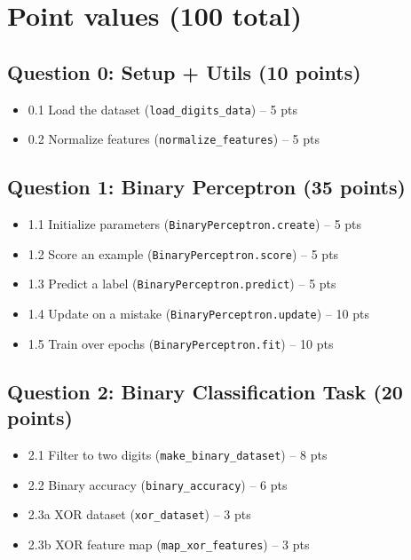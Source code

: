 \documentclass[11pt]{article}
\begin{document}
\section*{Point values (100 total)}

\subsection*{Question 0: Setup + Utils (10 points)}
\begin{itemize}[leftmargin=1.25em]
  \item 0.1 Load the dataset (\texttt{load\_digits\_data}) -- 5 pts
  \item 0.2 Normalize features (\texttt{normalize\_features}) -- 5 pts
\end{itemize}

\subsection*{Question 1: Binary Perceptron (35 points)}
\begin{itemize}[leftmargin=1.25em]
  \item 1.1 Initialize parameters (\texttt{BinaryPerceptron.create}) -- 5 pts
  \item 1.2 Score an example (\texttt{BinaryPerceptron.score}) -- 5 pts
  \item 1.3 Predict a label (\texttt{BinaryPerceptron.predict}) -- 5 pts
  \item 1.4 Update on a mistake (\texttt{BinaryPerceptron.update}) -- 10 pts
  \item 1.5 Train over epochs (\texttt{BinaryPerceptron.fit}) -- 10 pts
\end{itemize}

\subsection*{Question 2: Binary Classification Task (20 points)}
\begin{itemize}[leftmargin=1.25em]
  \item 2.1 Filter to two digits (\texttt{make\_binary\_dataset}) -- 8 pts
  \item 2.2 Binary accuracy (\texttt{binary\_accuracy}) -- 6 pts
  \item 2.3a XOR dataset (\texttt{xor\_dataset}) -- 3 pts
  \item 2.3b XOR feature map (\texttt{map\_xor\_features}) -- 3 pts
\end{itemize}
\end{document}
